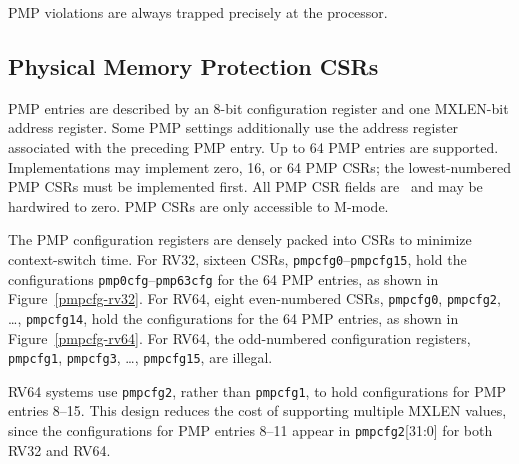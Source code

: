 PMP violations are always trapped precisely at the processor.

\subsection{Physical Memory Protection CSRs}

PMP entries are described by an 8-bit configuration register and one MXLEN-bit
address register.  Some PMP settings additionally use the address register
associated with the preceding PMP entry.
Up to 64 PMP entries are supported.
Implementations may implement zero, 16, or 64 PMP CSRs; the lowest-numbered
PMP CSRs must be implemented first.
All PMP CSR fields are \warl\ and may be hardwired to zero.
PMP CSRs are only accessible to M-mode.

The PMP configuration registers are densely packed into CSRs to minimize
context-switch time.
For RV32, sixteen CSRs, {\tt pmpcfg0}--{\tt pmpcfg15}, hold the configurations
{\tt pmp0cfg}--{\tt pmp63cfg} for the 64 PMP entries, as shown in
Figure~\ref{pmpcfg-rv32}.
For RV64, eight even-numbered CSRs,
{\tt pmpcfg0}, {\tt pmpcfg2}, \ldots, {\tt pmpcfg14}, hold the configurations
for the 64 PMP entries, as shown in Figure~\ref{pmpcfg-rv64}.
For RV64, the odd-numbered configuration registers,
{\tt pmpcfg1}, {\tt pmpcfg3}, \ldots, {\tt pmpcfg15}, are illegal.

\begin{commentary}
RV64 systems use {\tt pmpcfg2}, rather than {\tt pmpcfg1}, to hold
configurations for PMP entries 8--15.  This design reduces the cost of
supporting multiple MXLEN values, since the configurations for PMP
entries 8--11 appear in {\tt pmpcfg2}[31:0] for both RV32 and RV64.
\end{commentary}

